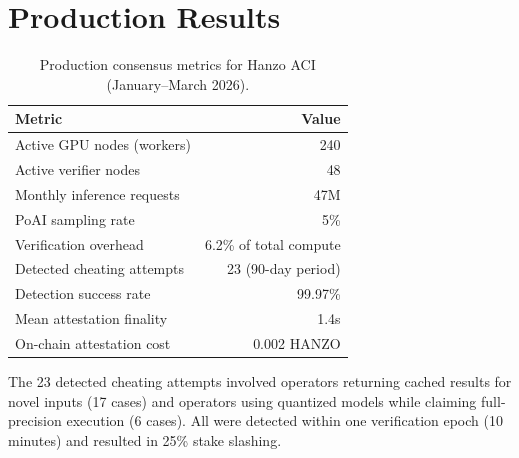 \section{Production Results}

\label{sec:results}

\begin{table}[H]
\centering
\small
\begin{tabular}{lr}
\toprule
\textbf{Metric} & \textbf{Value} \\
\midrule
Active GPU nodes (workers) & 240 \\
Active verifier nodes & 48 \\
Monthly inference requests & 47M \\
PoAI sampling rate & 5\% \\
Verification overhead & 6.2\% of total compute \\
Detected cheating attempts & 23 (90-day period) \\
Detection success rate & 99.97\% \\
Mean attestation finality & 1.4s \\
On-chain attestation cost & 0.002 HANZO \\
\bottomrule
\end{tabular}
\caption{Production consensus metrics for Hanzo ACI (January--March 2026).}
\label{tab:production}
\end{table}

The 23 detected cheating attempts involved operators returning cached results
for novel inputs (17 cases) and operators using quantized models while claiming
full-precision execution (6 cases). All were detected within one verification
epoch (10 minutes) and resulted in 25\% stake slashing.

